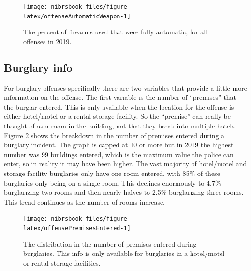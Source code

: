 \documentclass[
  12pt,
  openany]{book}
\begin{document}
\begin{figure}

{\centering \texttt{[image: nibrsbook\_files/figure-latex/offenseAutomaticWeapon-1]} 

}

\caption{The percent of firearms used that were fully automatic, for all offenses in 2019.}\label{fig:offenseAutomaticWeapon}
\end{figure}

\hypertarget{burglary-info}{%
\subsection{Burglary info}\label{burglary-info}}

For burglary offenses specifically there are two variables that provide a little more information on the offense. The first variable is the number of ``premises'' that the burglar entered. This is only available when the location for the offense is either hotel/motel or a rental storage facility. So the ``premise'' can really be thought of as a room in the building, not that they break into multiple hotels. Figure \ref{fig:offensePremisesEntered} shows the breakdown in the number of premises entered during a burglary incident. The graph is capped at 10 or more but in 2019 the highest number was 99 buildings entered, which is the maximum value the police can enter, so in reality it may have been higher. The vast majority of hotel/motel and storage facility burglaries only have one room entered, with 85\% of these burglaries only being on a single room. This declines enormously to 4.7\% burglarizing two rooms and then nearly halves to 2.5\% burglarizing three rooms. This trend continues as the number of rooms increase.

\begin{figure}

{\centering \texttt{[image: nibrsbook\_files/figure-latex/offensePremisesEntered-1]} 

}

\caption{The distribution in the number of premises entered during burglaries. This info is only available for burglaries in a hotel/motel or rental storage facilities.}\label{fig:offensePremisesEntered}
\end{figure}
\end{document}
